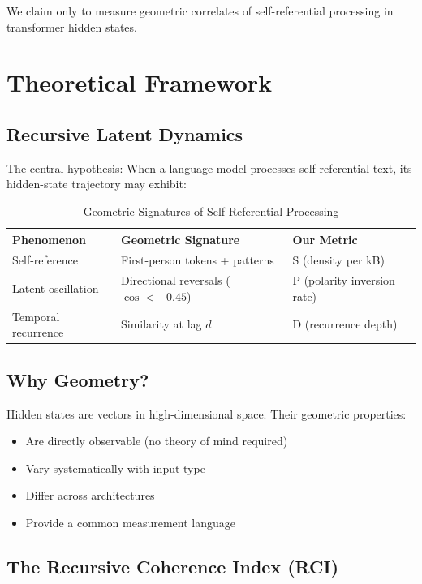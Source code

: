 \documentclass[12pt,a4paper]{article}
\begin{document}
We claim only to measure geometric correlates of self-referential processing in transformer hidden states.

\section{Theoretical Framework}

\subsection{Recursive Latent Dynamics}

The central hypothesis: When a language model processes self-referential text, its hidden-state trajectory may exhibit:

\begin{table}[h]
\centering
\caption{Geometric Signatures of Self-Referential Processing}
\begin{tabular}{lll}
\toprule
\textbf{Phenomenon} & \textbf{Geometric Signature} & \textbf{Our Metric} \\
\midrule
Self-reference & First-person tokens + patterns & S (density per kB) \\
Latent oscillation & Directional reversals ($\cos < -0.45$) & P (polarity inversion rate) \\
Temporal recurrence & Similarity at lag $d$ & D (recurrence depth) \\
\bottomrule
\end{tabular}
\end{table}

\subsection{Why Geometry?}

Hidden states are vectors in high-dimensional space. Their geometric properties:
\begin{itemize}[noitemsep]
    \item Are directly observable (no theory of mind required)
    \item Vary systematically with input type
    \item Differ across architectures
    \item Provide a common measurement language
\end{itemize}

\subsection{The Recursive Coherence Index (RCI)}
\end{document}
